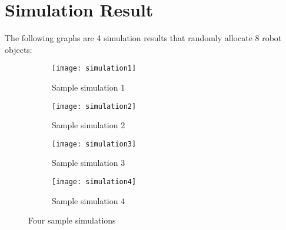 \documentclass{article}
\begin{document}
\section{Simulation Result}
\indent The following graphs are 4 simulation results that randomly allocate 8 robot objects:\\
 
\begin{figure}[h]
 
\begin{subfigure}{0.24\textwidth}
\texttt{[image: simulation1]} 
\caption{Sample simulation 1}
\label{fig:subim1}
\end{subfigure}
\begin{subfigure}{0.24\textwidth}
\texttt{[image: simulation2]}
\caption{Sample simulation 2}
\label{fig:subim2}
\end{subfigure}
\begin{subfigure}{0.24\textwidth}
\texttt{[image: simulation3]}
\caption{Sample simulation 3}
\label{fig:subim3}
\end{subfigure}
\begin{subfigure}{0.24\textwidth}
\texttt{[image: simulation4]}
\caption{Sample simulation 4}
\label{fig:subim4}
\end{subfigure}

\caption{Four sample simulations}
\label{fig:image2}
\end{figure}
\end{document}
